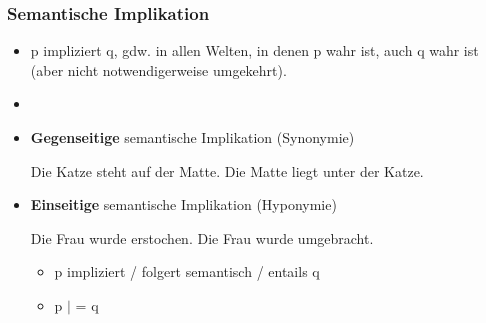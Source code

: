
\begin{frame}
\frametitle{Semantische Implikation}

\begin{itemize}
	\item p impliziert q, gdw. in allen Welten, in denen p wahr ist, auch q wahr ist (aber nicht notwendigerweise umgekehrt).
	\item[]
	\item \textbf{Gegenseitige} semantische Implikation (\ras Synonymie)
	
	\eal
		\ex Die Katze steht auf der Matte.
		\ex Die Matte liegt unter der Katze.
	\zl
	
	\item \textbf{Einseitige} semantische Implikation (\ras Hyponymie)
	
	\eal
		\ex Die Frau wurde erstochen.
		\ex Die Frau wurde umgebracht.
	\zl
	
	\begin{itemize}
		\item p impliziert / folgert semantisch / entails q
		\item p $|$ = q
	\end{itemize}
	
\end{itemize}

\end{frame}



